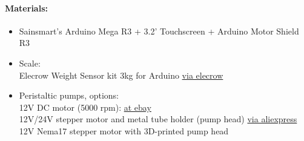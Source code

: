 \documentclass[12pt,a4paper]{scrartcl}
\begin{document}
\paragraph{Materials:}
\begin{itemize}
\item Sainsmart's Arduino Mega R3 + 3.2' Touchscreen + Arduino Motor Shield R3
\item Scale:\\ Elecrow Weight Sensor kit 3kg for Arduino
  \href{http://www.elecrow.com/weight-sensor-kit-3kg-p-883.html}{via
    elecrow}
\item Peristaltic pumps, options:\\
  12V DC motor (5000 rpm): \href{http://www.ebay.de/itm/2stk-12V-Schlauchpumpe-Dosierpumpe-Peristaltikpumpe-Wasser-Pumpe-Silikonschlauch-/191363832760}{at ebay}\\
  12V/24V stepper motor and metal tube holder (pump head) \href{http://de.aliexpress.com/item/Peristaltic-Pump-with-step-motor-precision-peristaltic-pump-peristaltic-filling/2013487841.html}{via aliexpress}\\
  12V Nema17 stepper motor with 3D-printed pump head
\end{itemize}
\end{document}
